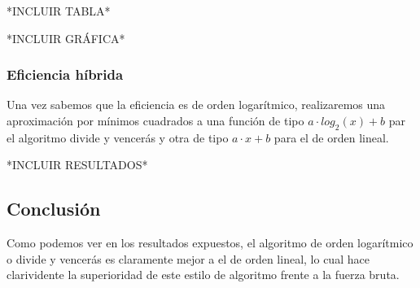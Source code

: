 \documentclass[a4paper, 11pt]{article}
\begin{document}
*INCLUIR TABLA*

*INCLUIR GRÁFICA*

\subsubsection{Eficiencia híbrida}
Una vez sabemos que la eficiencia es de orden logarítmico, realizaremos una aproximación por mínimos cuadrados a una función de tipo $a\cdot log_2(x) + b$ par el algoritmo divide y vencerás y otra de tipo $a\cdot x + b$ para el de orden lineal.

*INCLUIR RESULTADOS*

\subsection{Conclusión}
Como podemos ver en los resultados expuestos, el algoritmo de orden logarítmico o divide y vencerás es claramente mejor a el de orden lineal, lo cual hace clarividente la superioridad de este estilo de algoritmo frente a la fuerza bruta.
\end{document}
